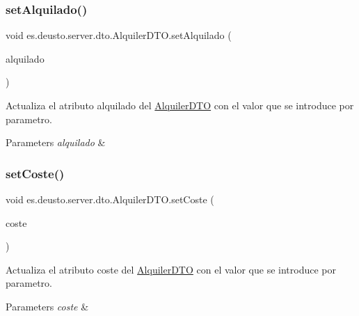 \subsubsection{\texorpdfstring{setAlquilado()}{setAlquilado()}}
{\footnotesize\ttfamily void es.\+deusto.\+server.\+dto.\+Alquiler\+D\+T\+O.\+set\+Alquilado (\begin{DoxyParamCaption}\item[{\mbox{\hyperlink{classes_1_1deusto_1_1server_1_1dto_1_1_articulo_d_t_o}{Articulo\+D\+TO}}}]{alquilado }\end{DoxyParamCaption})}

Actualiza el atributo alquilado del \mbox{\hyperlink{classes_1_1deusto_1_1server_1_1dto_1_1_alquiler_d_t_o}{Alquiler\+D\+TO}} con el valor que se introduce por parametro. 
\begin{DoxyParams}{Parameters}
{\em alquilado} & \\
\hline
\end{DoxyParams}
\mbox{\label{classes_1_1deusto_1_1server_1_1dto_1_1_alquiler_d_t_o_ad0f90f08697500e6c2bd27a88ea2b8d4}} 
\subsubsection{\texorpdfstring{setCoste()}{setCoste()}}
{\footnotesize\ttfamily void es.\+deusto.\+server.\+dto.\+Alquiler\+D\+T\+O.\+set\+Coste (\begin{DoxyParamCaption}\item[{double}]{coste }\end{DoxyParamCaption})}

Actualiza el atributo coste del \mbox{\hyperlink{classes_1_1deusto_1_1server_1_1dto_1_1_alquiler_d_t_o}{Alquiler\+D\+TO}} con el valor que se introduce por parametro. 
\begin{DoxyParams}{Parameters}
{\em coste} & \\
\hline
\end{DoxyParams}
\mbox{\label{classes_1_1deusto_1_1server_1_1dto_1_1_alquiler_d_t_o_ab37af5191dd929a17514bd387b6e7ce1}} 
